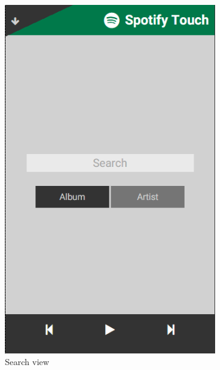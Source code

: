 \documentclass[conference]{IEEEtran}
\begin{document}
\begin{figure}[htbp]
    \centering
    \begin{subfigure}{0.45\columnwidth}
        \centering
        \includegraphics[width=0.9\linewidth]{spotify_search.png}
        \caption{Search view}
        \label{fig:SearchView}
    \end{subfigure}
    \begin{subfigure}{0.45\columnwidth}
        \centering

\end{subfigure}
\end{figure}
\end{document}
